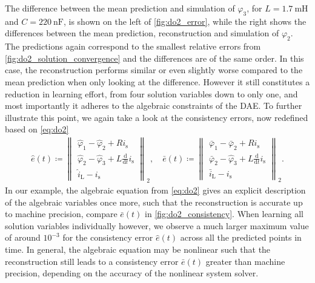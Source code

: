 \documentclass[AMA,STIX1COL]{WileyNJD-v2}
\newcommand{\mr}[1]{\mathrm{#1}}
\newcommand{\ddt}{\frac{\mathrm{d}}{\mathrm{d}t}}
\begin{document}
The difference between the mean prediction and simulation of $\varphi_3$, for $L = \SI{1.7}{\milli\henry}$ and $C = \SI{220}{\nano\farad}$, is shown on the left of \autoref{fig:do2_error}, while the right shows the differences between the mean prediction, reconstruction and simulation of $\varphi_2$. The predictions again correspond to the smallest relative errors from \autoref{fig:do2_solution_convergence} and the differences are of the same order. In this case, the reconstruction performs similar or even slightly worse compared to the mean prediction when only looking at the difference. However it still constitutes a reduction in learning effort, from four solution variables down to only one, and most importantly it adheres to the algebraic constraints of the DAE. To further illustrate this point, we again take a look at the consistency errors, now redefined based on \eqref{eq:do2}
\begin{align*}
    \hat{e}(t) \coloneqq \begin{Vmatrix}
        \hat{\varphi}_1 - \hat{\varphi}_2 + R i_\mr{s}\\
        \hat{\varphi}_2 - \hat{\varphi}_3 + L \ddt i_\mr{s}\\
        \hat{i}_\mr{L} - i_\mr{s}
    \end{Vmatrix}_2, \quad \bar{e}(t) \coloneqq \begin{Vmatrix}
        \bar{\varphi}_1 - \bar{\varphi}_2 + R i_\mr{s}\\
        \bar{\varphi}_2 - \hat{\varphi}_3 + L \ddt i_\mr{s}\\
        \bar{i}_\mr{L} - i_\mr{s}
    \end{Vmatrix}_2.
\end{align*}
In our example, the algebraic equation from \eqref{eq:do2} gives an explicit description of the algebraic variables once more, such that the reconstruction is accurate up to machine precision, compare $\bar{e}(t)$ in \autoref{fig:do2_consistency}. When learning all solution variables individually however, we observe a much larger maximum value of around $10^{-3}$ for the consistency error $\hat{e}(t)$ across all the predicted points in time. In general, the algebraic equation may be nonlinear such that the reconstruction still leads to a consistency error $\bar{e}(t)$ greater than machine precision, depending on the accuracy of the nonlinear system solver.
\end{document}
